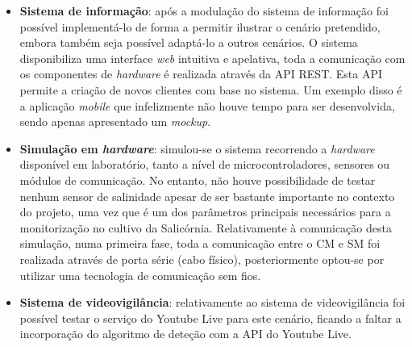 \begin{itemize}
	
	\item \textbf{Sistema de informação}: após a modulação do sistema de informação foi possível implementá-lo de forma a permitir ilustrar o cenário pretendido, embora também seja possível adaptá-lo a outros cenários. O sistema disponibiliza uma interface \textit{web} intuitiva e apelativa, toda a comunicação com os componentes de \textit{hardware} é realizada através da \ac{API} \ac{REST}. Esta \ac{API} permite a criação de novos clientes com base no sistema. Um exemplo disso é a aplicação \textit{mobile} que infelizmente não houve tempo para ser desenvolvida, sendo apenas apresentado um \textit{mockup}. 
	
	  
	
	\item \textbf{Simulação em \textit{hardware}}: simulou-se o sistema recorrendo a \textit{hardware} disponível em laboratório, tanto a nível de microcontroladores, sensores ou módulos de comunicação. No entanto, não houve possibilidade de testar nenhum sensor de salinidade apesar de ser bastante importante no contexto do projeto, uma vez que é um dos parâmetros principais necessários para a monitorização no cultivo da Salicórnia. Relativamente à comunicação desta simulação, numa primeira fase, toda a comunicação entre o \acl{CM} e \acl{SM} foi realizada através de porta série (cabo físico), posteriormente optou-se por utilizar uma tecnologia de comunicação sem fios. 
	 
	\item \textbf{Sistema de videovigilância}: relativamente ao sistema de videovigilância foi possível testar o serviço do Youtube Live para este cenário, ficando a faltar a incorporação do algoritmo de deteção com a API do Youtube Live. 
	

	
\end{itemize}





